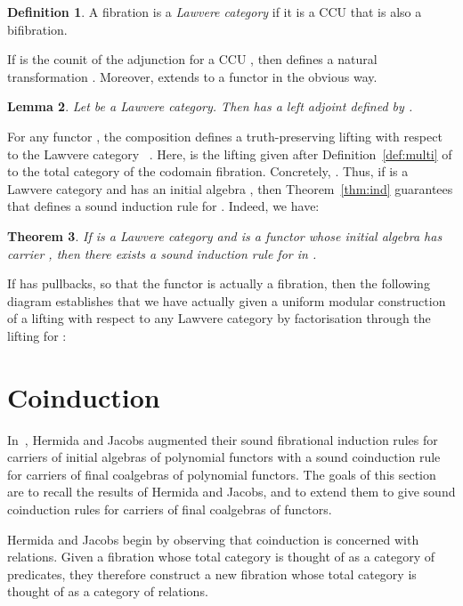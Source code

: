 \documentclass{LMCS}
\theoremstyle{plain}
\newtheorem{theorem}{Theorem}[section]
\newtheorem{lemma}[theorem]{Lemma}
\theoremstyle{remark}
\theoremstyle{definition}
\newtheorem{definition}[theorem]{Definition}
\begin{document}
\begin{definition}
  A fibration  is a {\em Lawvere category} if
  it is a CCU that is also a bifibration.
\end{definition}

If  is the counit of the adjunction  for a
CCU , then  defines a natural transformation
. 
Moreover,  extends to a functor  in the obvious way.

\begin{lemma}\label{lem:deflifting}
  Let  be a Lawvere category. Then  has a
  left adjoint  defined by .
\end{lemma}
\noindent
For any functor , the composition  defines a truth-preserving lifting with respect to the
Lawvere category ~\cite{gjf11}. Here,  is the lifting
given after Definition~\ref{def:multi} of  to the total category of
the codomain fibration. Concretely, . Thus, if  is a Lawvere category and  has an initial
algebra , then Theorem~\ref{thm:ind} guarantees that 
defines a sound induction rule for . Indeed, we have:

\begin{theorem}\label{thm:inda}
If  is a Lawvere category and  is a
functor whose initial algebra has carrier , then there exists a
sound induction rule for  in .
\end{theorem}
\noindent
If  has pullbacks, so that the functor  is actually
a fibration, then the following diagram establishes that we have
actually given a uniform modular construction of a lifting with
respect to any Lawvere category by factorisation through the lifting
for :



\section{Coinduction}\label{sec:coind}

In~\cite{hj98}, Hermida and Jacobs augmented their sound fibrational
induction rules for carriers of initial algebras of polynomial
functors with a sound coinduction rule for carriers of final
coalgebras of polynomial functors. The goals of this section are to
recall the results of Hermida and Jacobs, and to extend them to give
sound coinduction rules for carriers of final coalgebras of functors.

Hermida and Jacobs begin by observing that coinduction is concerned
with relations. Given a fibration  whose total category is thought
of as a category of predicates, they therefore construct a new
fibration  whose total category is thought of as a category of
relations.
\end{document}
